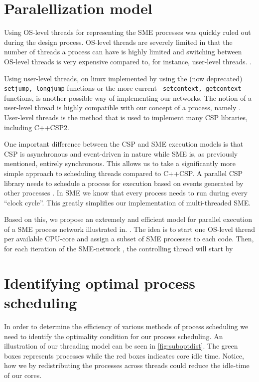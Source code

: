 \section{Paralellization model}

Using OS-level threads for representing the SME processes was quickly
ruled out during the design process. OS-level threads are severely
limited in that the number of threads a process can have is highly
limited  and
switching between OS-level threads is very expensive compared to, for
instance, user-level threads. \cite{sung2002comparative}.

Using user-level threads, on linux implemented by using the (now
deprecated) \texttt{setjump, longjump} functions or the more current
\texttt{ setcontext, getcontext} functions, is another possible way of
implementing our networks. The notion of a user-level thread is highly
compatible with our concept of a process, namely
. User-level threads is the method that is used to
implement many CSP libraries, including C++CSP2.

One important difference between the CSP and SME execution models is
that CSP is asynchronous and event-driven in nature while SME is, as
previously mentioned, entirely synchronous. This allows us to take a
significantly more simple approach to scheduling threads compared to
C++CSP. A parallel CSP library needs to schedule a process for
execution based on events generated by other processes
\cite{brown2003introduction}. In SME we know that every process needs
to run  during every ``clock
cycle''. This greatly simplifies our implementation of multi-threaded
SME.

Based on this, we propose an extremely and efficient model for
parallel execution of a SME process network illustrated
in. . The idea is
to start one OS-level thread per available CPU-core and assign a
subset of SME processes to each code. Then, for each iteration of the
SME-network , the controlling thread will start by



\section{Identifying optimal process scheduling}
In order to determine the efficiency of various methods of process
scheduling we need to identify the optimality condition for our
process scheduling. An illustration of our threading model can be seen in
\cref{fig:suboptdist}. The green boxes represents processes while the
red boxes indicates core idle time. Notice, how we by redistributing
the processes across threads could reduce the idle-time of our
cores.

